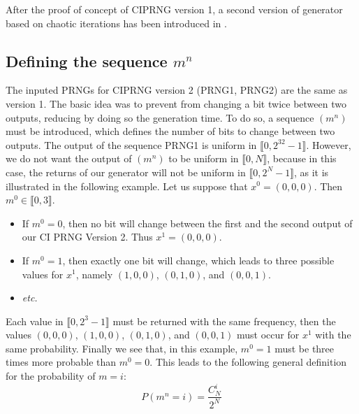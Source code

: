 %
After the proof of concept of CIPRNG version 1, a second version of generator based on chaotic iterations has been introduced in \cite{wbg10:ip}.
\subsection{Defining the sequence $m^n$ }
\label{algo m}
The inputed PRNGs for CIPRNG version 2 (PRNG1, PRNG2) are the same as version 1. The basic idea was to prevent from changing a bit twice between two outputs, reducing by doing so the generation time. 
To do so, a sequence $(m^n)$ must be introduced, which defines the number 
of bits to change between two outputs.
The output of the sequence PRNG1 is uniform in $\llbracket 0, 2^{32}-1 \rrbracket$. However, we do not want the output of $(m^n)$ to be uniform in $\llbracket 0, N \rrbracket$, because in this case, the returns of our generator will not be uniform in $\llbracket 0, 2^{N}-1 \rrbracket$, as it is illustrated in the following example. Let us suppose that $x^0=(0,0,0)$. Then $m^0 \in \llbracket 0, 3 \rrbracket$. 
\begin{itemize}
\item If $m^0=0$, then no bit will change between the first and the second output of our CI PRNG Version 2. Thus $x^1 = (0,0,0)$.
\item If $m^0=1$, then exactly one bit will change, which leads to three possible values for $x^1$, namely $(1,0,0)$, $(0,1,0)$, and $(0,0,1)$.
\item \emph{etc.}
\end{itemize}
Each value in $\llbracket 0, 2^3-1 \rrbracket$ must be returned with the same frequency, then the values $(0,0,0)$, $(1,0,0)$, $(0,1,0)$, and $(0,0,1)$ must occur for $x^1$ with the same probability. Finally we see that, in this example, $m^0=1$ must be three times more probable than $m^0=0$.
This leads to the following general definition for the probability of $m=i$:
\begin{equation}
P(m^n=i)=\frac{C^i_N}{2^N}
\end{equation}

